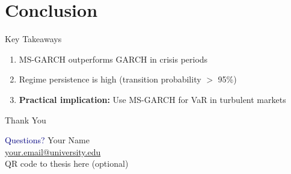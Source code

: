 \documentclass[aspectratio=169]{beamer}
\begin{document}
\section{Conclusion}

\begin{frame}{Key Takeaways}
\begin{enumerate}
    \item \textcolor{accent}{MS-GARCH outperforms} GARCH in crisis periods
    \item Regime persistence is high (transition probability $>$ 95\%)
    \item \textbf{Practical implication:} Use MS-GARCH for VaR in turbulent markets
\end{enumerate}
\end{frame}

\begin{frame}{Thank You}
\begin{center}
\Large \textcolor{navy}{Questions?}
\vspace{5mm}
\normalsize
Your Name \\
\href{mailto:your.email@university.edu}{your.email@university.edu} \\
\vspace{3mm}
\small \textcolor{accent}{QR code to thesis here (optional)}
\end{center}
\end{frame}
\end{document}
